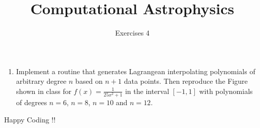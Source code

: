 \documentclass[10pt,letterpaper,notitlepage]{report}
\begin{document}
\title{Computational Astrophysics}
\author{Exercises 4 }
\maketitle

\begin{enumerate}

\item Implement a routine that generates Lagrangean interpolating
  polynomials of arbitrary degree $n$ based on $n+1$ data points. Then
  reproduce the Figure shown in class  for $f(x) = \frac{1}{25 x^2 + 1}$ in the interval
  $[-1,1]$ with polynomials of degrees $n=6$, $n=8$, $n=10$ and $n=12$.

\end{enumerate}

Happy Coding !!
\end{document}
